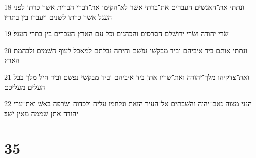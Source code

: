 \par 18 ונתתי את־האנשׁים העברים את־ברתי אשׁר לא־הקימו את־דברי הברית אשׁר כרתו לפני העגל אשׁר כרתו לשׁנים ויעברו בין בתריו׃
\par 19 שׂרי יהודה ושׂרי ירושׁלם הסרסים והכהנים וכל עם הארץ העברים בין בתרי העגל׃
\par 20 ונתתי אותם ביד איביהם וביד מבקשׁי נפשׁם והיתה נבלתם למאכל לעוף השׁמים ולבהמת הארץ׃
\par 21 ואת־צדקיהו מלך־יהודה ואת־שׂריו אתן ביד איביהם וביד מבקשׁי נפשׁם וביד חיל מלך בבל העלים מעליכם׃
\par 22 הנני מצוה נאם־יהוה והשׁבתים אל־העיר הזאת ונלחמו עליה ולכדוה ושׂרפה באשׁ ואת־ערי יהודה אתן שׁממה מאין ישׁב׃

\chapter{35}


